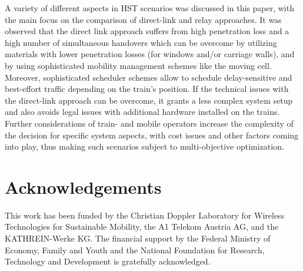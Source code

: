 \documentclass[a4paper,conference,twocolumn,10pt]{IEEEtran}
\begin{document}
A variety of different aspects in \ac{HST} scenarios was discussed in this paper, with the main focus on the comparison of direct-link and relay approaches.
It was observed that the direct link approach suffers from high penetration loss and a high number of simultaneous handovers which can be overcome by utilizing materials with lower penetration losses (for windows and/or carriage walls), and by using sophisticated mobility management schemes like the moving cell. Moreover, sophisticated scheduler schemes allow to schedule delay-sensitive and best-effort traffic depending on the train's position. If the technical issues with the direct-link approach can be overcome, it grants a less complex system setup and also avoids legal issues with additional hardware installed on the trains. Further considerations of train- and mobile operators increase the complexity of the decision for specific system aspects, with cost issues and other factors coming into play, thus making such scenarios subject to multi-objective optimization.



\section*{Acknowledgements}
This work has been funded by the Christian Doppler Laboratory for Wireless Technologies for Sustainable Mobility, the A1 Telekom Austria AG, and the KATHREIN-Werke KG. The financial support by the Federal Ministry of Economy, Family and Youth and the National Foundation for Research, Technology and Development is gratefully acknowledged.

\balance
\scriptsize \footnotesize \small

\end{document}
